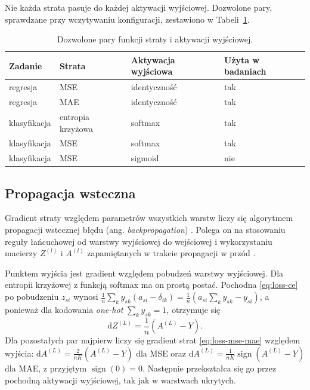 Nie każda strata pasuje do każdej aktywacji wyjściowej. Dozwolone pary, sprawdzane przy wczytywaniu konfiguracji, zestawiono w Tabeli~\ref{tab:loss-pairs}.

\begin{table}[H]
    \centering
    \caption{Dozwolone pary funkcji straty i aktywacji wyjściowej.}
    \label{tab:loss-pairs}
    \begin{tabular}{llll}
        \toprule
        Zadanie & Strata & Aktywacja wyjściowa & Użyta w badaniach \\
        \midrule
        regresja & MSE & identyczność & tak \\
        regresja & MAE & identyczność & tak \\
        klasyfikacja & entropia krzyżowa & softmax & tak \\
        klasyfikacja & MSE & softmax & tak \\
        klasyfikacja & MSE & sigmoid & nie \\
        \bottomrule
    \end{tabular}
\end{table}

\subsection{Propagacja wsteczna}
\label{sec:mlp-backprop}

Gradient straty względem parametrów wszystkich warstw liczy się algorytmem propagacji wstecznej błędu (ang. \textit{backpropagation}) \cite{rumelhart1986}. Polega on na stosowaniu reguły łańcuchowej od warstwy wyjściowej do wejściowej i wykorzystaniu macierzy $Z^{(l)}$ i $A^{(l)}$ zapamiętanych w trakcie propagacji w przód \cite{goodfellow2016}.

Punktem wyjścia jest gradient względem pobudzeń warstwy wyjściowej. Dla entropii krzyżowej z funkcją softmax ma on prostą postać. Pochodna \eqref{eq:loss-ce} po pobudzeniu $z_{si}$ wynosi $\frac{1}{n} \sum_k y_{sk} (a_{si} - \delta_{ik}) = \frac{1}{n} (a_{si} \sum_k y_{sk} - y_{si})$, a ponieważ dla kodowania \textit{one-hot} $\sum_k y_{sk} = 1$, otrzymuje się
\begin{equation}
    \mathrm{d}Z^{(L)} = \frac{1}{n} \left( A^{(L)} - Y \right).
    \label{eq:dz-output}
\end{equation}
Dla pozostałych par najpierw liczy się gradient strat \eqref{eq:loss-mse-mae} względem wyjścia: $\mathrm{d}A^{(L)} = \frac{2}{nK} (A^{(L)} - Y)$ dla MSE oraz $\mathrm{d}A^{(L)} = \frac{1}{nK} \operatorname{sign}(A^{(L)} - Y)$ dla MAE, z przyjętym $\operatorname{sign}(0) = 0$. Następnie przekształca się go przez pochodną aktywacji wyjściowej, tak jak w warstwach ukrytych.

